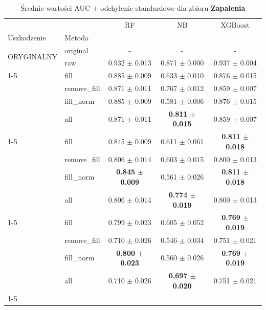 \begin{table}[htbp]
\caption{Średnie wartości AUC $\pm$ odchylenie standardowe dla zbioru \textbf{Zapalenia}}
\label{tab:wyniki_zapalenia}
\begin{tabular}{llccc}
\toprule
 &  & RF & NB & XGBoost \\
Uszkodzenie & Metoda &  &  &  \\
\midrule
\multirow[t]{2}{*}{ORYGINALNY} & original & - & - & - \\
 & raw & 0.932 $\pm$ 0.013 & 0.871 $\pm$ 0.000 & 0.937 $\pm$ 0.004 \\
\cline{1-5}
\multirow[t]{5}{*}{20%
 & fill & 0.885 $\pm$ 0.009 & 0.633 $\pm$ 0.010 & 0.876 $\pm$ 0.015 \\
 & remove_fill & 0.871 $\pm$ 0.011 & 0.767 $\pm$ 0.012 & 0.859 $\pm$ 0.007 \\
 & fill_norm & 0.885 $\pm$ 0.009 & 0.581 $\pm$ 0.006 & 0.876 $\pm$ 0.015 \\
 & all & 0.871 $\pm$ 0.011 & \textbf{0.811 $\pm$ 0.015} & 0.859 $\pm$ 0.007 \\
\cline{1-5}
\multirow[t]{5}{*}{40%
 & fill & 0.845 $\pm$ 0.009 & 0.611 $\pm$ 0.061 & \textbf{0.811 $\pm$ 0.018} \\
 & remove_fill & 0.806 $\pm$ 0.014 & 0.603 $\pm$ 0.015 & 0.800 $\pm$ 0.013 \\
 & fill_norm & \textbf{0.845 $\pm$ 0.009} & 0.561 $\pm$ 0.026 & \textbf{0.811 $\pm$ 0.018} \\
 & all & 0.806 $\pm$ 0.014 & \textbf{0.774 $\pm$ 0.019} & 0.800 $\pm$ 0.013 \\
\cline{1-5}
\multirow[t]{5}{*}{60%
 & fill & 0.799 $\pm$ 0.023 & 0.605 $\pm$ 0.052 & \textbf{0.769 $\pm$ 0.019} \\
 & remove_fill & 0.710 $\pm$ 0.026 & 0.546 $\pm$ 0.034 & 0.751 $\pm$ 0.021 \\
 & fill_norm & \textbf{0.800 $\pm$ 0.023} & 0.560 $\pm$ 0.026 & \textbf{0.769 $\pm$ 0.019} \\
 & all & 0.710 $\pm$ 0.026 & \textbf{0.697 $\pm$ 0.020} & 0.751 $\pm$ 0.021 \\
\cline{1-5}
\bottomrule
\end{tabular}
\end{table}
